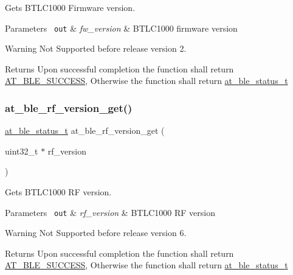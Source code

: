 Gets B\+T\+L\+C1000 Firmware version. 


\begin{DoxyParams}[1]{Parameters}
\mbox{\texttt{ out}}  & {\em fw\+\_\+version} & B\+T\+L\+C1000 firmware version\\
\hline
\end{DoxyParams}
\begin{DoxyWarning}{Warning}
Not Supported before release version 2.
\end{DoxyWarning}
\begin{DoxyReturn}{Returns}
Upon successful completion the function shall return \mbox{\hyperlink{group__error__codes__group_gga3b1db9b95feb157b3c188ca27fe76988a7e3bfff5387331cd4f2c56cbcbbd7e19}{A\+T\+\_\+\+B\+L\+E\+\_\+\+S\+U\+C\+C\+E\+SS}}, Otherwise the function shall return \mbox{\hyperlink{at__ble__api_8h_ace24eb4e5ca3f325c663b809da5feb92}{at\+\_\+ble\+\_\+status\+\_\+t}} 
\end{DoxyReturn}
\mbox{\label{group__gap__misc__group_gae548b85d5a03b4e15990da3f829f6220}} 
\subsubsection{\texorpdfstring{at\_ble\_rf\_version\_get()}{at\_ble\_rf\_version\_get()}}
{\footnotesize\ttfamily \mbox{\hyperlink{group__error__codes__group_ga3b1db9b95feb157b3c188ca27fe76988}{at\+\_\+ble\+\_\+status\+\_\+t}} at\+\_\+ble\+\_\+rf\+\_\+version\+\_\+get (\begin{DoxyParamCaption}\item[{uint32\+\_\+t $\ast$}]{rf\+\_\+version }\end{DoxyParamCaption})}



Gets B\+T\+L\+C1000 RF version. 


\begin{DoxyParams}[1]{Parameters}
\mbox{\texttt{ out}}  & {\em rf\+\_\+version} & B\+T\+L\+C1000 RF version\\
\hline
\end{DoxyParams}
\begin{DoxyWarning}{Warning}
Not Supported before release version 6.
\end{DoxyWarning}
\begin{DoxyReturn}{Returns}
Upon successful completion the function shall return \mbox{\hyperlink{group__error__codes__group_gga3b1db9b95feb157b3c188ca27fe76988a7e3bfff5387331cd4f2c56cbcbbd7e19}{A\+T\+\_\+\+B\+L\+E\+\_\+\+S\+U\+C\+C\+E\+SS}}, Otherwise the function shall return \mbox{\hyperlink{at__ble__api_8h_ace24eb4e5ca3f325c663b809da5feb92}{at\+\_\+ble\+\_\+status\+\_\+t}} 
\end{DoxyReturn}
\mbox{\label{group__gap__misc__group_gad0b3d4bdff9b2778397f2fe65fc5efa1}} 

